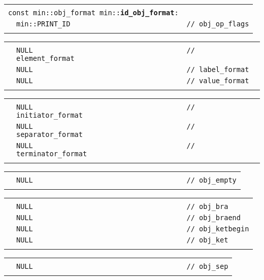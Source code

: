 \documentclass[12pt]{article}
\makeatletter
\newcommand{\TT}[1]{{\tt \bfseries #1}}
\newcommand{\ttindex}[1]{\index{#1@{\tt #1}}}
\newenvironment{indpar}[1][0.3in]%
	{\begin{list}{}%
		     {\setlength{\itemsep}{0in}%
		      \setlength{\topsep}{0in}%
		      \setlength{\parsep}{1ex}%
		      \setlength{\labelwidth}{#1}%
		      \setlength{\leftmargin}{#1}%
		      \addtolength{\leftmargin}{\labelsep}}%
	 \item}%
	{\end{list}}
\newcommand{\LABEL}[1]{\label{#1}}
\newlength{\ARGBREAKLENGTH}
\newcommand{\ARGBREAK}[1][\ARGBREAKLENGTH]{\\&\hspace*{#1}}
\newcommand{\MINKEY}[1]%
	   {\TT{#1}\ttindex{min::#1}\ttindex{#1}}
\makeatother
\begin{document}
\begin{indpar}[1em]
\begin{tabular}{r@{}l}\hspace*{0.1in} \\[-3ex]
\multicolumn{2}{l}{\tt const min::obj\_format
                   min::\MINKEY{id\_obj\_format}:}%
\LABEL{MIN::ID_OBJ_FORMAT}\ARGBREAK
\verb|min::PRINT_ID                            // obj_op_flags|\ARGBREAK
\end{tabular}

\vspace{-4ex}\begin{tabular}{r@{}l}\hspace*{0.1in}\ARGBREAK
\verb|NULL                                     // element_format|\ARGBREAK
\verb|NULL                                     // label_format|\ARGBREAK
\verb|NULL                                     // value_format|\ARGBREAK
\end{tabular}

\vspace{-4ex}\begin{tabular}{r@{}l}\hspace*{0.1in}\ARGBREAK
\verb|NULL                                     // initiator_format|\ARGBREAK
\verb|NULL                                     // separator_format|\ARGBREAK
\verb|NULL                                     // terminator_format|\ARGBREAK
\end{tabular}

\vspace{-4ex}\begin{tabular}{r@{}l}\hspace*{0.1in}\ARGBREAK
\verb|NULL                                     // obj_empty|\ARGBREAK
\end{tabular}

\vspace{-4ex}\begin{tabular}{r@{}l}\hspace*{0.1in}\ARGBREAK
\verb|NULL                                     // obj_bra|\ARGBREAK
\verb$NULL                                     // obj_braend$\ARGBREAK
\verb$NULL                                     // obj_ketbegin$\ARGBREAK
\verb|NULL                                     // obj_ket|\ARGBREAK
\end{tabular}

\vspace{-4ex}\begin{tabular}{r@{}l}\hspace*{0.1in}\ARGBREAK
\verb|NULL                                     // obj_sep|\ARGBREAK
\end{tabular}


\end{indpar}
\end{document}

